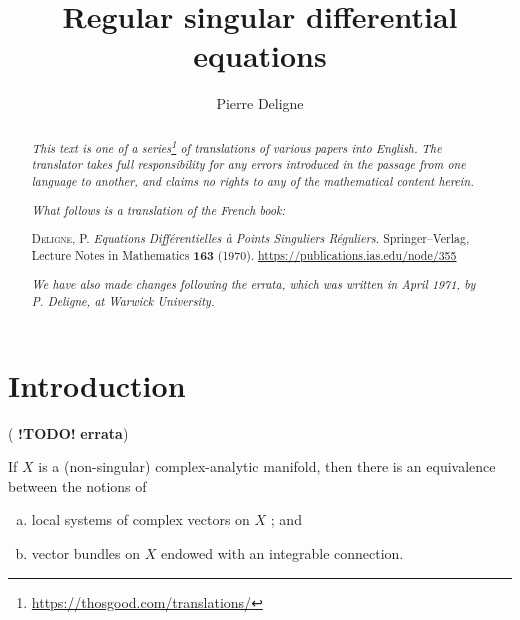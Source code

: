 \documentclass{report}
\title{Regular singular differential equations}
\author{Pierre Deligne}
\date{}
\theoremstyle{plain}
\theoremstyle{definition}
\newcommand{\todo}{\textbf{ !TODO! }}
\newcommand{\oldpage}[1]{\marginpar{\footnotesize$\Big\vert$ \textit{p.~#1}}}
\begin{document}
\hypersetup{pageanchor=false}
\begin{titlepage}
\maketitle
\end{titlepage}

\renewcommand{\abstractname}{Translator's note.}

\begin{abstract}
  \renewcommand*{\thefootnote}{\fnsymbol{footnote}}
  \emph{This text is one of a series\footnote{\url{https://thosgood.com/translations/}} of translations of various papers into English.}
  \emph{The translator takes full responsibility for any errors introduced in the passage from one language to another, and claims no rights to any of the mathematical content herein.}

  \medskip
  
  \emph{What follows is a translation of the French book:}

  \medskip\noindent
  \textsc{Deligne, P.}
  \emph{Equations Diff\'{e}rentielles \`{a} Points Singuliers R\'{e}guliers.}
  Springer--Verlag, Lecture Notes in Mathematics \textbf{163} (1970).
  {\url{https://publications.ias.edu/node/355}}

  \medskip
  \noindent\emph{We have also made changes following the errata, which was written in April 1971, by P. Deligne, at Warwick University.}
\end{abstract}

\hypersetup{pageanchor=true}

\setcounter{footnote}{0}

\tableofcontents



\setcounter{chapter}{-1}

\chapter{Introduction}
\label{0}

(\todo \textbf{errata})

\oldpage{1}
If $X$ is a (non-singular) complex-analytic manifold, then there is an equivalence between the notions of
\begin{enumerate}[a)]
  \item local systems of complex vectors on $X$ ; and
  \item vector bundles on $X$ endowed with an integrable connection.
\end{enumerate}
\end{document}
